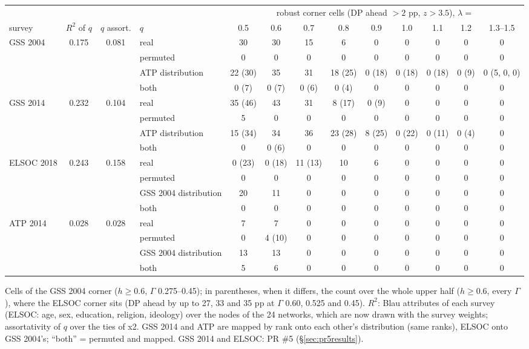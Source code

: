\documentclass[11pt,a4paper]{article}
\begin{document}
\begin{center}
\scriptsize
\setlength{\tabcolsep}{2pt}
\setlength{\tabcolsep}{2pt}
\begin{tabular}{@{}lcclccccccccc@{}}
\toprule
 & & & & \multicolumn{9}{c}{robust corner cells (DP ahead $> 2$ pp, $z > 3.5$), $\lambda =$} \\
survey & $R^2$ of $q$ & $q$ assort. & $q$ & 0.5 & 0.6 & 0.7 & 0.8 & 0.9 & 1.0 & 1.1 & 1.2 & 1.3--1.5 \\
\midrule
GSS 2004 & 0.175 & 0.081 & real & 30 & 30 & 15 & 6 & 0 & 0 & 0 & 0 & 0 \\
 & & & permuted & 0 & 0 & 0 & 0 & 0 & 0 & 0 & 0 & 0 \\
 & & & ATP distribution & 22 (30) & 35 & 31 & 18 (25) & 0 (18) & 0 (18) & 0 (18) & 0 (9) & 0 (5, 0, 0) \\
 & & & both & 0 (7) & 0 (7) & 0 (6) & 0 (4) & 0 & 0 & 0 & 0 & 0 \\
\midrule
GSS 2014 & 0.232 & 0.104 & real & 35 (46) & 43 & 31 & 8 (17) & 0 (9) & 0 & 0 & 0 & 0 \\
 & & & permuted & 5 & 0 & 0 & 0 & 0 & 0 & 0 & 0 & 0 \\
 & & & ATP distribution & 15 (34) & 34 & 36 & 23 (28) & 8 (25) & 0 (22) & 0 (11) & 0 (4) & 0 \\
 & & & both & 0 & 0 (6) & 0 & 0 & 0 & 0 & 0 & 0 & 0 \\
\midrule
ELSOC 2018 & 0.243 & 0.158 & real & 0 (23) & 0 (18) & 11 (13) & 10 & 6 & 0 & 0 & 0 & 0 \\
 & & & permuted & 0 & 0 & 0 & 0 & 0 & 0 & 0 & 0 & 0 \\
 & & & GSS 2004 distribution & 20 & 11 & 0 & 0 & 0 & 0 & 0 & 0 & 0 \\
 & & & both & 0 & 0 & 0 & 0 & 0 & 0 & 0 & 0 & 0 \\
\midrule
ATP 2014 & 0.028 & 0.028 & real & 7 & 7 & 0 & 0 & 0 & 0 & 0 & 0 & 0 \\
 & & & permuted & 0 & 4 (10) & 0 & 0 & 0 & 0 & 0 & 0 & 0 \\
 & & & GSS 2004 distribution & 13 & 13 & 0 & 0 & 0 & 0 & 0 & 0 & 0 \\
 & & & both & 5 & 6 & 0 & 0 & 0 & 0 & 0 & 0 & 0 \\
\bottomrule
\end{tabular}
\end{center}
\noindent Cells of the GSS 2004 corner ($h \ge 0.6$, $\Gamma$ 0.275--0.45); in parentheses, when it
differs, the count over the whole upper half ($h \ge 0.6$, every $\Gamma$), where the ELSOC corner sits
(DP ahead by up to 27, 33 and 35 pp at $\Gamma$ 0.60, 0.525 and 0.45). $R^2$: Blau attributes of each
survey (ELSOC: age, sex, education, religion, ideology) over the nodes of the 24 networks, which are
now drawn with the survey weights; assortativity of $q$ over the ties of x2. GSS 2014 and ATP are mapped
by rank onto each other's distribution (same ranks), ELSOC onto GSS 2004's; ``both'' = permuted and
mapped. GSS 2014 and ELSOC: PR \#5 (\S\ref{sec:pr5results}).
\end{document}
